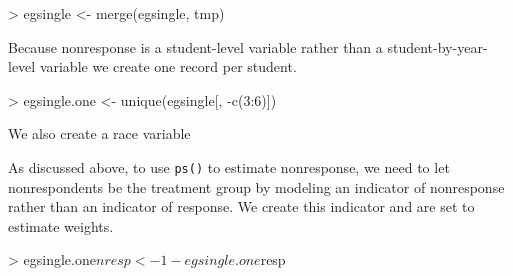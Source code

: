 \documentclass{article}
\begin{document}
\begin{Schunk}
\begin{Sinput}
> egsingle <- merge(egsingle, tmp)
\end{Sinput}
\end{Schunk}

Because nonresponse is a student-level variable rather than a
student-by-year-level variable we create one record per student.

\begin{Schunk}
\begin{Sinput}
> egsingle.one <- unique(egsingle[, -c(3:6)])
\end{Sinput}
\end{Schunk}

We also create a race variable

\begin{Schunk}
\end{Schunk}

As discussed above, to use \texttt{ps()} to estimate nonresponse, we
need to let nonrespondents be the treatment group by modeling an
indicator of nonresponse rather than an indicator of response.  We
create this indicator and are set to estimate weights.

\begin{Schunk}
\begin{Sinput}
> egsingle.one$nresp <- 1 - egsingle.one$resp
\end{Sinput}
\end{Schunk}
\end{document}
